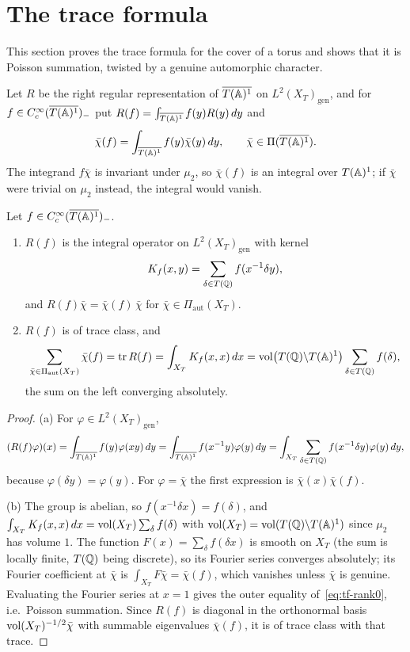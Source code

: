 \section{The trace formula}\label{sec:tf-rank0}

This section proves the trace formula for the cover of a torus and
shows that it is Poisson summation, twisted by a genuine automorphic
character.


Let $R$ be the right regular representation of $\overline{T(\mathbb{A})^1}$ on
$L^2(X_T)_{\mathrm{gen}}$, and for $f\in C_c^\infty(\overline{T(\mathbb{A})^1})_-$
put $R(f)=\int_{\overline{T(\mathbb{A})^1}}f(y)R(y)\,dy$ and
\[
\bar\chi(f)=\int_{\overline{T(\mathbb{A})^1}}f(y)\bar\chi(y)\,dy,\qquad
\bar\chi\in\Pi(\overline{T(\mathbb{A})^1}).
\]
The integrand $f\bar\chi$ is invariant under $\mu_2$, so $\bar\chi(f)$ is
an integral over $T(\mathbb{A})^1$; if $\bar\chi$ were trivial on $\mu_2$ instead,
the integral would vanish.

\begin{theorem}\label{thm:tf-rank0}
Let $f\in C_c^\infty(\overline{T(\mathbb{A})^1})_-$.
\begin{enumerate}[label=(\alph*)]
\item $R(f)$ is the integral operator on $L^2(X_T)_{\mathrm{gen}}$ with
  kernel
  \[
  K_f(x,y)=\sum_{\delta\in T(\mathbb{Q})}f(x^{-1}\delta y),
  \]
  and $R(f)\bar\chi=\bar\chi(f)\,\bar\chi$ for
  $\bar\chi\in\Pi_{\mathrm{aut}}(X_T)$.
\item $R(f)$ is of trace class, and
  \begin{equation}\label{eq:tf-rank0}
  \sum_{\bar\chi\in\Pi_{\mathrm{aut}}(X_T)}\bar\chi(f)
  =\operatorname{tr}R(f)=\int_{X_T}K_f(x,x)\,dx
  =\operatorname{vol}\bigl(T(\mathbb{Q})\backslash T(\mathbb{A})^1\bigr)\sum_{\delta\in T(\mathbb{Q})}f(\delta),
  \end{equation}
  the sum on the left converging absolutely.
\end{enumerate}
\end{theorem}

\begin{proof}
(a) For $\varphi\in L^2(X_T)_{\mathrm{gen}}$,
\[
(R(f)\varphi)(x)=\int_{\overline{T(\mathbb{A})^1}}f(y)\varphi(xy)\,dy
=\int_{\overline{T(\mathbb{A})^1}}f(x^{-1}y)\varphi(y)\,dy
=\int_{X_T}\sum_{\delta\in T(\mathbb{Q})}f(x^{-1}\delta y)\varphi(y)\,dy,
\]
because $\varphi(\delta y)=\varphi(y)$. For $\varphi=\bar\chi$ the first
expression is $\bar\chi(x)\bar\chi(f)$.

(b) The group is abelian, so $f(x^{-1}\delta x)=f(\delta)$, and
$\int_{X_T}K_f(x,x)\,dx=\operatorname{vol}(X_T)\sum_\delta f(\delta)$ with
$\operatorname{vol}(X_T)=\operatorname{vol}(T(\mathbb{Q})\backslash T(\mathbb{A})^1)$ since $\mu_2$
has volume $1$. The function $F(x)=\sum_{\delta}f(\delta x)$ is smooth on
$X_T$ (the sum is locally finite, $T(\mathbb{Q})$ being discrete), so its Fourier
series converges absolutely; its Fourier coefficient at $\bar\chi$ is
$\int_{X_T}F\bar\chi=\bar\chi(f)$, which vanishes unless $\bar\chi$ is
genuine. Evaluating the Fourier series at $x=1$ gives the outer equality
of~\eqref{eq:tf-rank0}, i.e.\ Poisson summation. Since $R(f)$ is diagonal
in the orthonormal basis $\operatorname{vol}(X_T)^{-1/2}\bar\chi$ with summable
eigenvalues $\bar\chi(f)$, it is of trace class with that trace.
\end{proof}

